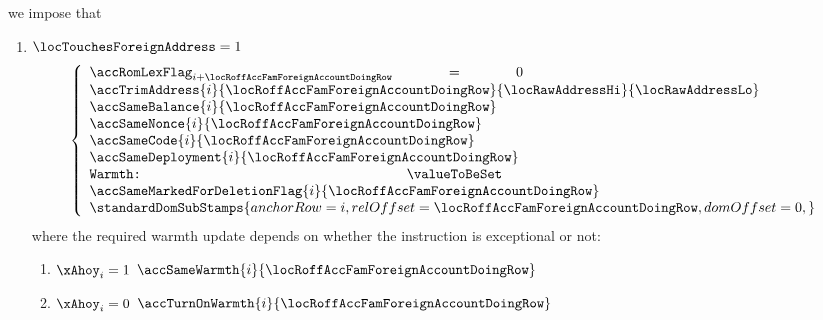\begin{description}
		we impose that
		\begin{enumerate}
			\item \If $\locTouchesForeignAddress = 1$ \Then
				\[
					\left\{ \begin{array}{lcl}
						\accRomLexFlag   _{i + \locRoffAccFamForeignAccountDoingRow} & = & 0 \\
						\multicolumn{3}{l}{\accTrimAddress
						{i}{\locRoffAccFamForeignAccountDoingRow}
						{\locRawAddressHi}
						{\locRawAddressLo}} \\
						\multicolumn{3}{l}{\accSameBalance                    {i}{\locRoffAccFamForeignAccountDoingRow}}   \\
						\multicolumn{3}{l}{\accSameNonce                      {i}{\locRoffAccFamForeignAccountDoingRow}}   \\
						\multicolumn{3}{l}{\accSameCode                       {i}{\locRoffAccFamForeignAccountDoingRow}}   \\
						\multicolumn{3}{l}{\accSameDeployment                 {i}{\locRoffAccFamForeignAccountDoingRow}}   \\
						\texttt{Warmth:} & \valueToBeSet                                                                   \\ 
						\multicolumn{3}{l}{\accSameMarkedForDeletionFlag      {i}{\locRoffAccFamForeignAccountDoingRow}}   \\
						\multicolumn{3}{l}{
							\standardDomSubStamps {
								anchorRow        = i                                    ,
								relOffset        = \locRoffAccFamForeignAccountDoingRow ,
								domOffset        = 0                                    ,
							}} \\
					\end{array} \right.
				\]
				where the required warmth update depends on whether the instruction is exceptional or not:
				\begin{enumerate}
					\item \If $\xAhoy _{i} = 1$ \Then $\accSameWarmth   {i}{\locRoffAccFamForeignAccountDoingRow}$
					\item \If $\xAhoy _{i} = 0$ \Then $\accTurnOnWarmth {i}{\locRoffAccFamForeignAccountDoingRow}$

\end{enumerate}
\end{enumerate}
\end{description}
